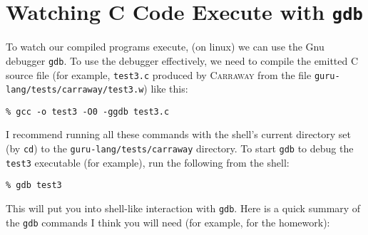 \documentclass{book}[12pt]
\newcommand{\carraway}[0]{\textsc{Carraway}\xspace}
\begin{document}
\section{Watching C Code Execute with \texttt{gdb}}

To watch our compiled programs execute, (on linux) we can use the Gnu
debugger \texttt{gdb}.  To use the debugger effectively, we need to
compile the emitted C source file (for example, \texttt{test3.c}
produced by \carraway from the file
\texttt{guru-lang/tests/carraway/test3.w}) like this:

\begin{verbatim}
% gcc -o test3 -O0 -ggdb test3.c
\end{verbatim}

\noindent I recommend running all these commands with the shell's
current directory set (by \texttt{cd}) to the
\texttt{guru-lang/tests/carraway} directory. To start \texttt{gdb} to
debug the \texttt{test3} executable (for example), run the following
from the shell:

\begin{verbatim}
% gdb test3
\end{verbatim}

\noindent This will put you into shell-like interaction with
\texttt{gdb}.  Here is a quick summary of the \texttt{gdb} commands I
think you will need (for example, for the homework):
\end{document}
